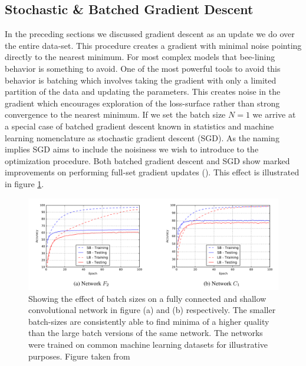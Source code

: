 \subsection{Stochastic \& Batched Gradient Descent}
In the preceding sections we discussed gradient descent as an update we do over the entire data-set. This procedure creates a gradient with minimal noise pointing directly to the nearest minimum. For most complex models that bee-lining behavior is something to avoid. One of the most powerful tools to avoid this behavior is batching which involves taking the gradient with only a limited partition of the data and updating the parameters. This creates noise in the gradient which encourages exploration of the loss-surface rather than strong convergence to the nearest minimum. If we set the batch size $N=1$ we arrive at a special case of batched gradient descent known in statistics and machine learning nomenclature as stochastic gradient descent (SGD). As the naming implies SGD aims to include the noisiness we wish to introduce to the optimization procedure. Both batched gradient descent and SGD show marked improvements on performing full-set gradient updates (\cite{Keskar2016}). This effect is illustrated in figure \ref{fig:batch_size}. 

\begin{figure}[H]
\centering
\includegraphics[width=\textwidth]{../figures/batch_size_plots}
\caption[Effect of the batch size on performance]{Showing the effect of batch sizes on a fully connected and shallow convolutional network in figure (a) and (b) respectively. The smaller batch-sizes are consistently able to find minima of a higher quality than the large batch versions of the same network. The networks were trained on common machine learning datasets for illustrative purposes. Figure taken from \citet{Keskar2016} }\label{fig:batch_size}
\end{figure}

